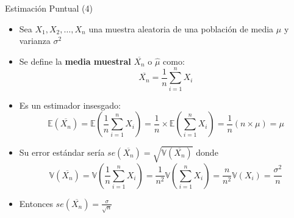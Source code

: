 \documentclass[handout]{beamer}
\begin{document}
\begin{frame}{Estimación Puntual (4)}
\scriptsize{

\begin{itemize}
 \item Sea $X_1,X_2,\dots,X_n$ una muestra aleatoria de una población de media $\mu$ y varianza $\sigma^2$
 \item Se define la \textbf{media muestral} $\overline{X_{n}}$ o $\hat{\mu}$ como:
 \begin{displaymath}
  \overline{X_{n}}=\frac{1}{n}\sum_{i=1}^{n} X_i
 \end{displaymath}
\item Es un estimador insesgado:
\begin{displaymath}
\mathbb{E}(\overline{X_{n}}) = \mathbb{E}(\frac 1n \sum_{i=1}^{n} X_i)  =  \frac 1n \times \mathbb{E}(\sum_{i=1}^{n} X_i) = \frac 1n (n \times \mu) = \mu  
\end{displaymath}

\item Su error estándar sería $se(\overline{X_{n}}) = \sqrt{\mathbb{V}(\overline{X_{n}})}$ donde
\begin{displaymath}
 \mathbb{V}(\overline{X_{n}})=\mathbb{V}(\frac 1n \sum_{i=1}^{n} X_i) = \frac{1}{n^2} \mathbb{V}(\sum_{i=1}^{n} X_i) = \frac{n}{n^2} \mathbb{V}(X_i)=\frac{\sigma^2}{n} 
\end{displaymath}

\item Entonces $se(\overline{X_{n}}) = \frac{\sigma}{\sqrt{n}}$

\end{itemize}


} 
\end{frame}
\end{document}

